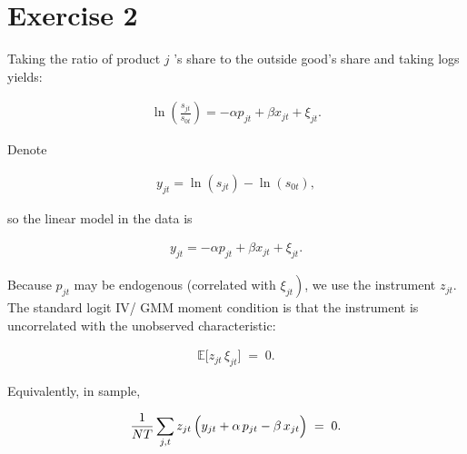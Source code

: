 \section*{Exercise 2}



Taking the ratio of product $j$ 's share to the outside good's share and taking logs yields:

\begin{align*}
\ln \left(\frac{s_{j t}}{s_{0 t}}\right)=-\alpha p_{j t}+\beta x_{j t}+\xi_{j t} .
\end{align*}


Denote

\begin{align*}
y_{j t}=\ln \left(s_{j t}\right)-\ln \left(s_{0 t}\right),
\end{align*}

so the linear model in the data is

\begin{align*}
y_{j t}=-\alpha p_{j t}+\beta x_{j t}+\xi_{j t} .
\end{align*}


Because $p_{j t}$ may be endogenous (correlated with $\left.\xi_{j t}\right)$, we use the instrument $z_{j t}$. The standard logit IV/ GMM moment condition is that the instrument is uncorrelated with the unobserved characteristic:

\begin{align*}
\mathbb{E}\bigl[z_{jt} \,\xi_{jt}\bigr] \;=\; 0.
\end{align*}

Equivalently, in sample,

\begin{align*}
\frac{1}{NT}\sum_{j,t} z_{jt} \,
\Bigl(y_{jt} + \alpha\,p_{jt} - \beta\,x_{jt}\Bigr)
\;=\; 0.
\end{align*}




